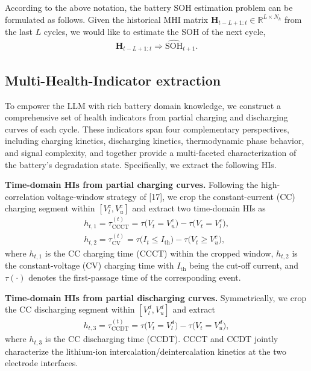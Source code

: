 \documentclass[preprint,12pt]{elsarticle}
\begin{document}
According to the above notation, the battery SOH estimation problem can be formulated as follows. Given the historical MHI matrix $\mathbf{H}_{t-L+1:t} \in \mathbb{R}^{L \times N_h}$ from the last $L$ cycles, we would like to estimate the SOH of the next cycle,
\begin{gather}
\mathbf{H}_{t-L+1:t} \Longrightarrow \widehat{\text{SOH}}_{t+1}.
\end{gather}

\subsection{Multi-Health-Indicator extraction}
To empower the LLM with rich battery domain knowledge, we construct a comprehensive set of health indicators from partial charging and discharging curves of each cycle. These indicators span four complementary perspectives, including charging kinetics, discharging kinetics, thermodynamic phase behavior, and signal complexity, and together provide a multi-faceted characterization of the battery's degradation state. Specifically, we extract the following HIs.

\textbf{Time-domain HIs from partial charging curves.} Following the high-correlation voltage-window strategy of [17], we crop the constant-current (CC) charging segment within $[V_l^c, V_u^c]$ and extract two time-domain HIs as
\begin{gather}
h_{t,1} = \tau_{\text{CCCT}}^{(t)} = \tau\bigl(V_t = V_u^c\bigr) - \tau\bigl(V_t = V_l^c\bigr), \\
h_{t,2} = \tau_{\text{CV}}^{(t)} = \tau\bigl(I_t \leq I_{\text{th}}\bigr) - \tau\bigl(V_t \geq V_u^c\bigr),
\end{gather}
where $h_{t,1}$ is the CC charging time (CCCT) within the cropped window, $h_{t,2}$ is the constant-voltage (CV) charging time with $I_{\text{th}}$ being the cut-off current, and $\tau(\cdot)$ denotes the first-passage time of the corresponding event.

\textbf{Time-domain HIs from partial discharging curves.} Symmetrically, we crop the CC discharging segment within $[V_l^d, V_u^d]$ and extract
\begin{gather}
h_{t,3} = \tau_{\text{CCDT}}^{(t)} = \tau\bigl(V_t = V_l^d\bigr) - \tau\bigl(V_t = V_u^d\bigr),
\end{gather}
where $h_{t,3}$ is the CC discharging time (CCDT). CCCT and CCDT jointly characterize the lithium-ion intercalation/deintercalation kinetics at the two electrode interfaces.
\end{document}
